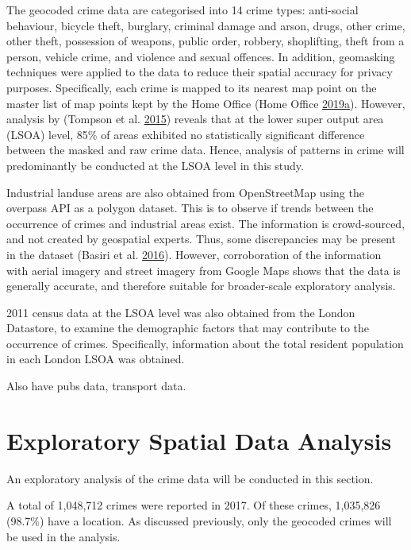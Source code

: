\documentclass[]{article}
\theoremstyle{definition}
\theoremstyle{definition}
\theoremstyle{definition}
\theoremstyle{remark}
\begin{document}
The geocoded crime data are categorised into 14 crime types: anti-social
behaviour, bicycle theft, burglary, criminal damage and arson, drugs,
other crime, other theft, possession of weapons, public order, robbery,
shoplifting, theft from a person, vehicle crime, and violence and sexual
offences. In addition, geomasking techniques were applied to the data to
reduce their spatial accuracy for privacy purposes. Specifically, each
crime is mapped to its nearest map point on the master list of map
points kept by the Home Office (Home Office
\protect\hyperlink{ref-Office2019}{2019}\protect\hyperlink{ref-Office2019}{a}).
However, analysis by (Tompson et al.
\protect\hyperlink{ref-Tompson2015}{2015}) reveals that at the lower
super output area (LSOA) level, 85\% of areas exhibited no statistically
significant difference between the masked and raw crime data. Hence,
analysis of patterns in crime will predominantly be conducted at the
LSOA level in this study.

Industrial landuse areas are also obtained from OpenStreetMap using the
overpass API as a polygon dataset. This is to observe if trends between
the occurrence of crimes and industrial areas exist. The information is
crowd-sourced, and not created by geospatial experts. Thus, some
discrepancies may be present in the dataset (Basiri et al.
\protect\hyperlink{ref-Basiri2016}{2016}). However, corroboration of the
information with aerial imagery and street imagery from Google Maps
shows that the data is generally accurate, and therefore suitable for
broader-scale exploratory analysis.

2011 census data at the LSOA level was also obtained from the London
Datastore, to examine the demographic factors that may contribute to the
occurrence of crimes. Specifically, information about the total resident
population in each London LSOA was obtained.

Also have pubs data, transport data.

\pagebreak

\section{Exploratory Spatial Data
Analysis}\label{exploratory-spatial-data-analysis}

An exploratory analysis of the crime data will be conducted in this
section.

A total of 1,048,712 crimes were reported in 2017. Of these crimes,
1,035,826 (98.7\%) have a location. As discussed previously, only the
geocoded crimes will be used in the analysis.
\end{document}

